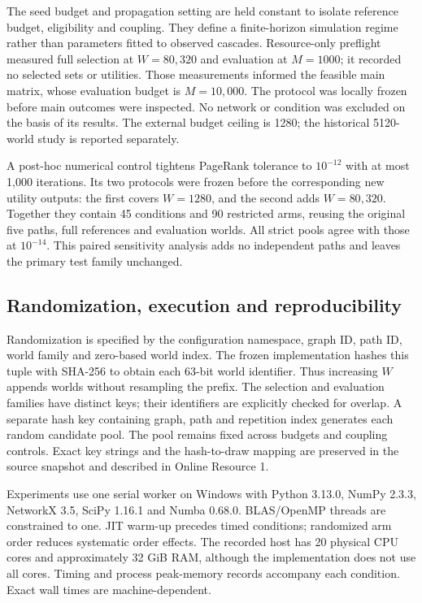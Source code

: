 \documentclass[smallextended]{svjour3}
\begin{document}
The seed budget and propagation setting are held constant to isolate reference budget, eligibility and coupling. They define a finite-horizon simulation regime rather than parameters fitted to observed cascades. Resource-only preflight measured full selection at $W=80,320$ and evaluation at $M=1000$; it recorded no selected sets or utilities. Those measurements informed the feasible main matrix, whose evaluation budget is $M=10,000$. The protocol was locally frozen before main outcomes were inspected. No network or condition was excluded on the basis of its results. The external budget ceiling is 1280; the historical 5120-world study is reported separately.

A post-hoc numerical control tightens PageRank tolerance to $10^{-12}$ with at most 1,000 iterations. Its two protocols were frozen before the corresponding new utility outputs: the first covers $W=1280$, and the second adds $W=80,320$. Together they contain 45 conditions and 90 restricted arms, reusing the original five paths, full references and evaluation worlds. All strict pools agree with those at $10^{-14}$. This paired sensitivity analysis adds no independent paths and leaves the primary test family unchanged.

\subsection{Randomization, execution and reproducibility}
Randomization is specified by the configuration namespace, graph ID, path ID, world family and zero-based world index. The frozen implementation hashes this tuple with SHA-256 to obtain each 63-bit world identifier. Thus increasing $W$ appends worlds without resampling the prefix. The selection and evaluation families have distinct keys; their identifiers are explicitly checked for overlap. A separate hash key containing graph, path and repetition index generates each random candidate pool. The pool remains fixed across budgets and coupling controls. Exact key strings and the hash-to-draw mapping are preserved in the source snapshot and described in Online Resource 1.

Experiments use one serial worker on Windows with Python 3.13.0, NumPy 2.3.3, NetworkX 3.5, SciPy 1.16.1 and Numba 0.68.0. BLAS/OpenMP threads are constrained to one. JIT warm-up precedes timed conditions; randomized arm order reduces systematic order effects. The recorded host has 20 physical CPU cores and approximately 32 GiB RAM, although the implementation does not use all cores. Timing and process peak-memory records accompany each condition. Exact wall times are machine-dependent.
\end{document}
